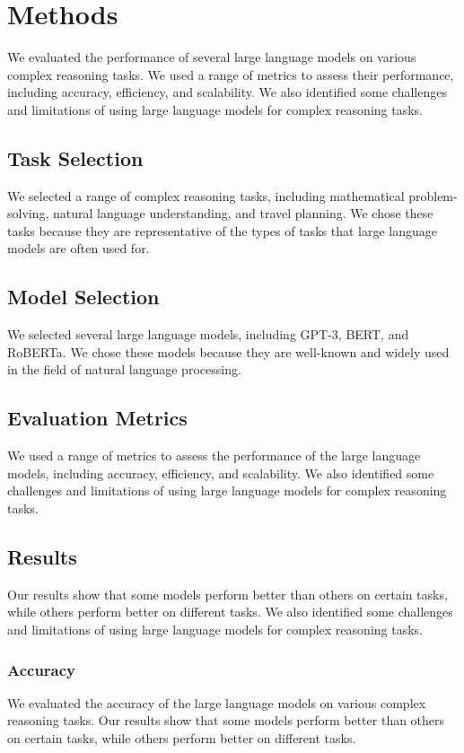 \documentclass{article}
\begin{document}
\section{Methods}
We evaluated the performance of several large language models on various complex reasoning tasks. We used a range of metrics to assess their performance, including accuracy, efficiency, and scalability. We also identified some challenges and limitations of using large language models for complex reasoning tasks.

\subsection{Task Selection}
We selected a range of complex reasoning tasks, including mathematical problem-solving, natural language understanding, and travel planning. We chose these tasks because they are representative of the types of tasks that large language models are often used for.

\subsection{Model Selection}
We selected several large language models, including GPT-3, BERT, and RoBERTa. We chose these models because they are well-known and widely used in the field of natural language processing.

\subsection{Evaluation Metrics}
We used a range of metrics to assess the performance of the large language models, including accuracy, efficiency, and scalability. We also identified some challenges and limitations of using large language models for complex reasoning tasks.

\subsection{Results}
Our results show that some models perform better than others on certain tasks, while others perform better on different tasks. We also identified some challenges and limitations of using large language models for complex reasoning tasks.

\subsubsection{Accuracy}
We evaluated the accuracy of the large language models on various complex reasoning tasks. Our results show that some models perform better than others on certain tasks, while others perform better on different tasks.
\end{document}

